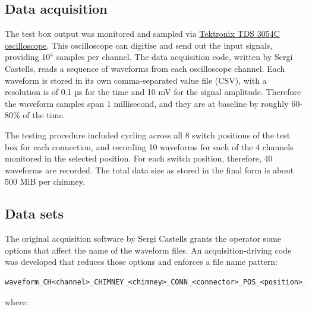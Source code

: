 \subsection{Data acquisition}
\label{ssec:DAQ}

The test box output was monitored and sampled via
\href{https://www.tek.com/datasheet/digital-phosphor-oscilloscopes-0}{Tektronix
TDS 3054C oscilloscope}. This oscilloscope can digitise and send out the
input signals, providing \(10^4\) samples per channel. The data
acquisition code, written by Sergi Castells, reads a sequence of
waveforms from each oscilloscope channel. Each waveform is stored in its
own comma-separated value file (CSV), with a resolution is of 0.1 µs for
the time and 10 mV for the signal amplitude. Therefore the waveform
samples span 1 millisecond, and they are at baseline by roughly 60-80\%
of the time.

The testing procedure included cycling across all 8 switch positions of
the test box for each connection, and recording 10 waveforms for each of
the 4 channels monitored in the selected position. For each switch
position, therefore, 40 waveforms are recorded. The total data size as
stored in the final form is about 500 MiB per chimney.

\subsection{Data sets}
\label{ssec:data-sets}

The original acquisition software by Sergi Castells grants the operator
some options that affect the name of the waveform files. An
acquisition-driving code was developed that reduces those options and
enforces a file name pattern:

\begin{verbatim}
waveform_CH<channel>_CHIMNEY_<chimney>_CONN_<connector>_POS_<position>_<index>.csv
\end{verbatim}

where:

